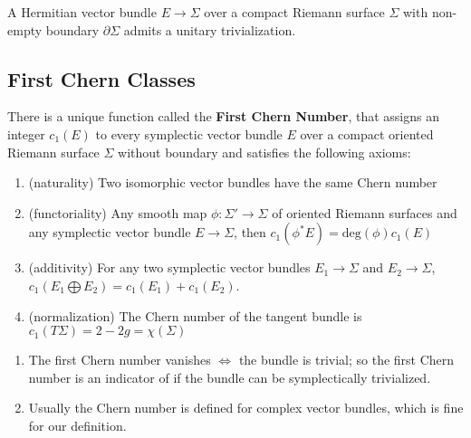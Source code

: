 \begin{prop}

A Hermitian vector bundle $E \to \Sigma$ over a compact Riemann surface $\Sigma$ with non-empty boundary $\partial \Sigma$ admits a unitary trivialization.

\end{prop}

\subsection{First Chern Classes}

\begin{thm}

There is a unique function called the \textbf{First Chern Number}, that assigns an integer $c_1(E)$ to every symplectic vector bundle $E$ over a compact oriented Riemann surface $\Sigma$ without boundary and satisfies the following axioms:

\begin{enumerate}
    \item (naturality) Two isomorphic vector bundles have the same Chern number
    \item (functoriality) Any smooth map $\phi: \Sigma' \to \Sigma$ of oriented Riemann surfaces and any symplectic vector bundle $E \to \Sigma$, then $c_1(\phi^*E) = \mathrm{deg}(\phi) c_1(E)$
    \item (additivity) For any two symplectic vector bundles $E_1 \to \Sigma$ and $E_2 \to \Sigma$, $c_1(E_1 \bigoplus E_2) = c_1(E_1) + c_1(E_2)$.
    \item (normalization) The Chern number of the tangent bundle is $c_1(T\Sigma) = 2 - 2g = \chi(\Sigma)$
\end{enumerate}

\end{thm}

\begin{rmk} 

\begin{enumerate}
    \item The first Chern number vanishes $\iff$ the bundle is trivial; so the first Chern number is an indicator of if the bundle can be symplectically trivialized.
    \item Usually the Chern number is defined for complex vector bundles, which is fine for our definition.
\end{enumerate}
\end{rmk}





